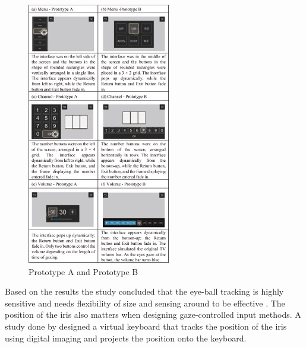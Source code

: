 \documentclass{vgtc}                          %
\begin{document}
\begin{figure}[h!]
 \centering %
 \includegraphics[width=\columnwidth]{PA.jpg}
 \caption{Prototype A and Prototype B}
 \label{fig:prototype}
\end{figure}
Based on the results the study concluded that the eye-ball tracking is highly sensitive and needs flexibility of size and sensing around to be effective \cite{16}. 
The position of the iris also matters when designing gaze-controlled input methods. A study done by  \cite{14}  designed a virtual keyboard that tracks the position of the iris using digital imaging and projects the position onto the keyboard. 
\end{document}
